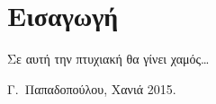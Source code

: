 \chapter*{Εισαγωγή}

Σε αυτή την πτυχιακή θα γίνει χαμός\ldots




\bigskip

\begin{flushright}
\begin{minipage}{150pt}
Γ.\ Παπαδοπούλου, Χανιά 2015.
\end{minipage}
\end{flushright}



\endinput
